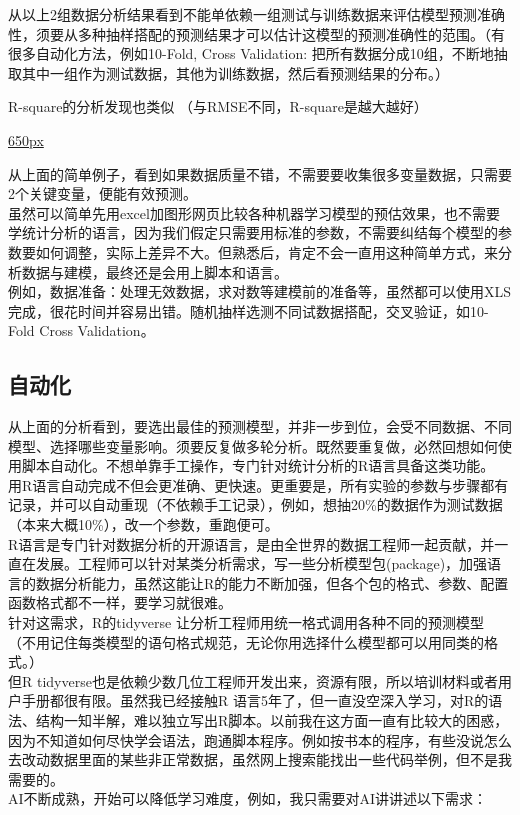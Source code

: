 从以上2组数据分析结果看到不能单依赖一组测试与训练数据来评估模型预测准确性，须要从多种抽样搭配的预测结果才可以估计这模型的预测准确性的范围。（有很多自动化方法，例如10-Fold,
Cross Validation:
把所有数据分成10组，不断地抽取其中一组作为测试数据，其他为训练数据，然后看预测结果的分布。）

R-square的分析发现也类似 （与RMSE不同，R-square是越大越好）

\href{文件:ComparerRsq_Screenshot_2025-03-08_142338.jpg}{650px}

从上面的简单例子，看到如果数据质量不错，不需要要收集很多变量数据，只需要2个关键变量，便能有效预测。\\
虽然可以简单先用excel加图形网页比较各种机器学习模型的预估效果，也不需要学统计分析的语言，因为我们假定只需要用标准的参数，不需要纠结每个模型的参数要如何调整，实际上差异不大。但熟悉后，肯定不会一直用这种简单方式，来分析数据与建模，最终还是会用上脚本和语言。\\
例如，数据准备：处理无效数据，求对数等建模前的准备等，虽然都可以使用XLS完成，很花时间并容易出错。随机抽样选测不同试数据搭配，交叉验证，如10-Fold
Cross Validation。

\hypertarget{ux81eaux52a8ux5316}{%
\subsection{自动化}\label{ux81eaux52a8ux5316}}

从上面的分析看到，要选出最佳的预测模型，并非一步到位，会受不同数据、不同模型、选择哪些变量影响。须要反复做多轮分析。既然要重复做，必然回想如何使用脚本自动化。不想单靠手工操作，专门针对统计分析的R语言具备这类功能。\\
用R语言自动完成不但会更准确、更快速。更重要是，所有实验的参数与步骤都有记录，并可以自动重现（不依赖手工记录），例如，想抽20\%的数据作为测试数据（本来大概10\%），改一个参数，重跑便可。\\
R语言是专门针对数据分析的开源语言，是由全世界的数据工程师一起贡献，并一直在发展。工程师可以针对某类分析需求，写一些分析模型包(package)，加强语言的数据分析能力，虽然这能让R的能力不断加强，但各个包的格式、参数、配置函数格式都不一样，要学习就很难。\\
针对这需求，R的tidyverse 让分析工程师用统一格式调用各种不同的预测模型
（不用记住每类模型的语句格式规范，无论你用选择什么模型都可以用同类的格式。）\\
但R
tidyverse也是依赖少数几位工程师开发出来，资源有限，所以培训材料或者用户手册都很有限。虽然我已经接触R
语言5年了，但一直没空深入学习，对R的语法、结构一知半解，难以独立写出R脚本。以前我在这方面一直有比较大的困惑，因为不知道如何尽快学会语法，跑通脚本程序。例如按书本的程序，有些没说怎么去改动数据里面的某些非正常数据，虽然网上搜索能找出一些代码举例，但不是我需要的。\\
AI不断成熟，开始可以降低学习难度，例如，我只需要对AI讲讲述以下需求：

